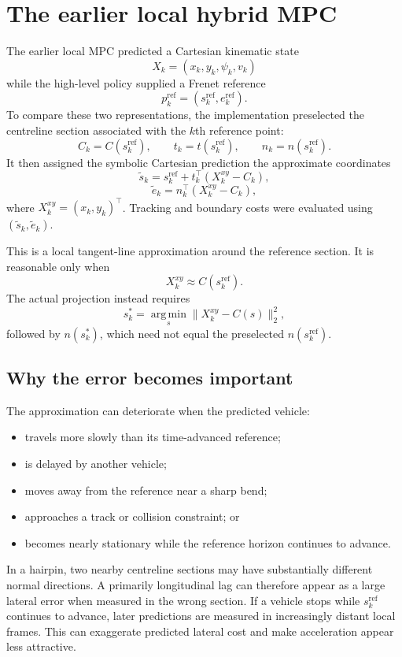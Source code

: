 \documentclass[11pt]{article}
\begin{document}
\section{The earlier local hybrid MPC}

The earlier local MPC predicted a Cartesian kinematic state
\[
  X_k=(x_k,y_k,\psi_k,v_k)
\]
while the high-level policy supplied a Frenet reference
\[
  p_k^{\mathrm{ref}}
  =
  (s_k^{\mathrm{ref}},e_k^{\mathrm{ref}}).
\]
To compare these two representations, the implementation preselected the
centreline section associated with the $k$th reference point:
\[
  C_k=C(s_k^{\mathrm{ref}}),\qquad
  t_k=t(s_k^{\mathrm{ref}}),\qquad
  n_k=n(s_k^{\mathrm{ref}}).
\]
It then assigned the symbolic Cartesian prediction the approximate coordinates
\[
  \widetilde s_k
  =s_k^{\mathrm{ref}}
  +t_k^\top(X_k^{xy}-C_k),
\]
\[
  \widetilde e_k
  =n_k^\top(X_k^{xy}-C_k),
\]
where $X_k^{xy}=(x_k,y_k)^\top$. Tracking and boundary costs were evaluated
using $(\widetilde s_k,\widetilde e_k)$.

This is a local tangent-line approximation around the reference section. It is
reasonable only when
\[
  X_k^{xy}\approx C(s_k^{\mathrm{ref}}).
\]
The actual projection instead requires
\[
  s_k^*=\underset{s}{\operatorname{arg\,min}}
  \|X_k^{xy}-C(s)\|_2^2,
\]
followed by $n(s_k^*)$, which need not equal the preselected
$n(s_k^{\mathrm{ref}})$.

\subsection{Why the error becomes important}

The approximation can deteriorate when the predicted vehicle:

\begin{itemize}
  \item travels more slowly than its time-advanced reference;
  \item is delayed by another vehicle;
  \item moves away from the reference near a sharp bend;
  \item approaches a track or collision constraint; or
  \item becomes nearly stationary while the reference horizon continues to
  advance.
\end{itemize}

In a hairpin, two nearby centreline sections may have substantially different
normal directions. A primarily longitudinal lag can therefore appear as a
large lateral error when measured in the wrong section. If a vehicle stops
while $s_k^{\mathrm{ref}}$ continues to advance, later predictions are measured
in increasingly distant local frames. This can exaggerate predicted lateral
cost and make acceleration appear less attractive.
\end{document}
